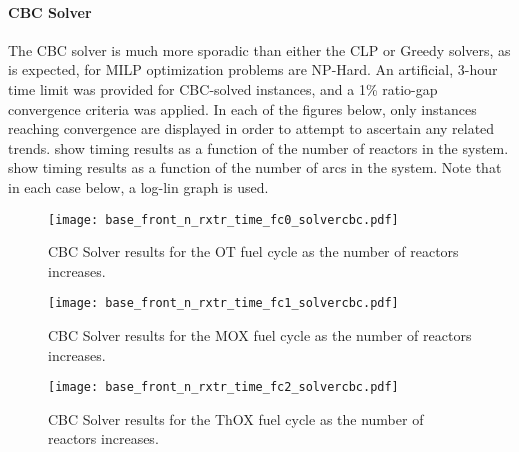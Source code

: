 \paragraph{CBC Solver}

The CBC solver is much more sporadic than either the CLP or Greedy solvers, as
is expected, for MILP optimization problems are NP-Hard. An artificial, 3-hour
time limit was provided for CBC-solved instances, and a 1\% ratio-gap
convergence criteria was applied. In each of the figures below, only instances
reaching convergence are displayed in order to attempt to ascertain any related
trends. 
show timing results as a function of the number of reactors in the
system. 
show timing results as a function of the number of arcs in the system. Note that
in each case below, a log-lin graph is used.

\begin{figure}[h!]
  \begin{center}
    \texttt{[image: base\_front\_n\_rxtr\_time\_fc0\_solvercbc.pdf]}
    \caption[]{
      \label{fig:base_front_n_rxtr_time_fc0_solvercbc}
      CBC Solver results for the OT fuel cycle as the number of reactors
      increases.
      }
  \end{center}
\end{figure}

\begin{figure}[h!]
  \begin{center}
    \texttt{[image: base\_front\_n\_rxtr\_time\_fc1\_solvercbc.pdf]}
    \caption[]{
      \label{fig:base_front_n_rxtr_time_fc1_solvercbc}
      CBC Solver results for the MOX fuel cycle as the number of reactors
      increases.
      }
  \end{center}
\end{figure}

\begin{figure}[h!]
  \begin{center}
    \texttt{[image: base\_front\_n\_rxtr\_time\_fc2\_solvercbc.pdf]}
    \caption[]{
      \label{fig:base_front_n_rxtr_time_fc2_solvercbc}
      CBC Solver results for the ThOX fuel cycle as the number of reactors
      increases.
      }
  \end{center}
\end{figure}

